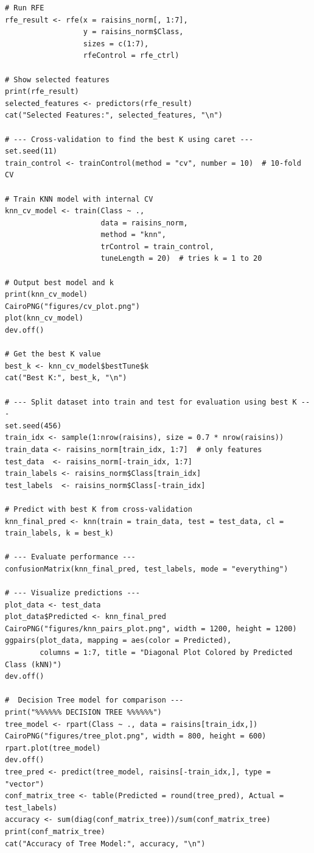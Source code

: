 \documentclass{article}
\begin{document}
\begin{thebibliography}{9}
\begin{verbatim}
# Run RFE
rfe_result <- rfe(x = raisins_norm[, 1:7],
                  y = raisins_norm$Class,
                  sizes = c(1:7),
                  rfeControl = rfe_ctrl)

# Show selected features
print(rfe_result)
selected_features <- predictors(rfe_result)
cat("Selected Features:", selected_features, "\n")

# --- Cross-validation to find the best K using caret ---
set.seed(11)
train_control <- trainControl(method = "cv", number = 10)  # 10-fold CV

# Train KNN model with internal CV
knn_cv_model <- train(Class ~ ., 
                      data = raisins_norm, 
                      method = "knn", 
                      trControl = train_control, 
                      tuneLength = 20)  # tries k = 1 to 20

# Output best model and k
print(knn_cv_model)
CairoPNG("figures/cv_plot.png")
plot(knn_cv_model)
dev.off()

# Get the best K value
best_k <- knn_cv_model$bestTune$k
cat("Best K:", best_k, "\n")

# --- Split dataset into train and test for evaluation using best K ---
set.seed(456)
train_idx <- sample(1:nrow(raisins), size = 0.7 * nrow(raisins))
train_data <- raisins_norm[train_idx, 1:7]  # only features
test_data  <- raisins_norm[-train_idx, 1:7]
train_labels <- raisins_norm$Class[train_idx]
test_labels  <- raisins_norm$Class[-train_idx]

# Predict with best K from cross-validation
knn_final_pred <- knn(train = train_data, test = test_data, cl = train_labels, k = best_k)

# --- Evaluate performance ---
confusionMatrix(knn_final_pred, test_labels, mode = "everything")

# --- Visualize predictions ---
plot_data <- test_data
plot_data$Predicted <- knn_final_pred
CairoPNG("figures/knn_pairs_plot.png", width = 1200, height = 1200)
ggpairs(plot_data, mapping = aes(color = Predicted),
        columns = 1:7, title = "Diagonal Plot Colored by Predicted Class (kNN)")
dev.off()

#  Decision Tree model for comparison ---
print("%%%%%% DECISION TREE %%%%%%")
tree_model <- rpart(Class ~ ., data = raisins[train_idx,])
CairoPNG("figures/tree_plot.png", width = 800, height = 600)
rpart.plot(tree_model)
dev.off()
tree_pred <- predict(tree_model, raisins[-train_idx,], type = "vector")
conf_matrix_tree <- table(Predicted = round(tree_pred), Actual = test_labels)
accuracy <- sum(diag(conf_matrix_tree))/sum(conf_matrix_tree)
print(conf_matrix_tree)
cat("Accuracy of Tree Model:", accuracy, "\n")
\end{verbatim}
\newpage

\end{thebibliography}
\end{document}
